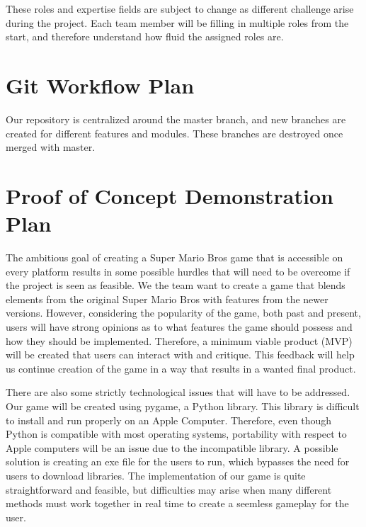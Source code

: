 \documentclass{article}
\begin{document}
These roles and expertise fields are subject to change as different challenge
arise during the project. Each team member will be filling in multiple roles
from the start, and therefore understand how fluid the assigned roles are.

\section{Git Workflow Plan}

Our repository is centralized around the master branch, and new branches are 
created for different features and modules. These branches are destroyed once merged with master. 

\section{Proof of Concept Demonstration Plan}
%
%
%


The ambitious goal of creating a Super Mario Bros game that is accessible on
every platform results in some possible hurdles that will need to be overcome if
the project is seen as feasible. We the team want to create a game that blends
elements from the original Super Mario Bros with features from the newer
versions. However, considering the popularity of the game, both past and
present, users will have strong opinions as to what features the game should
possess and how they should be implemented. Therefore, a minimum viable product
(MVP) will be created that users can interact with and critique. This feedback
will help us continue creation of the game in a way that results in a wanted
final product.

There are also some strictly technological issues that will have to be
addressed. Our game will be created using pygame, a Python library. This library
is difficult to install and run properly on an Apple Computer. Therefore, even
though Python is compatible with most operating systems, portability with
respect to Apple computers will be an issue due to the incompatible library. A
possible solution is creating an exe file for the users to run, which bypasses
the need for users to download libraries. The implementation of our game is
quite straightforward and feasible, but difficulties may arise when many
different methods must work together in real time to create a seemless gameplay
for the user.
\end{document}

